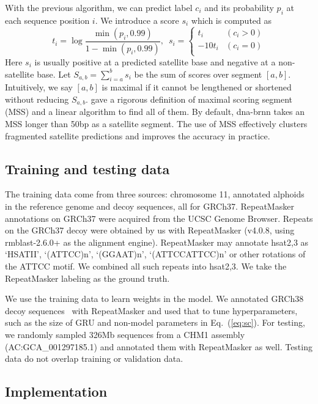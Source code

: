 \documentclass{bioinfo}
\begin{document}
\begin{methods}
With the previous algorithm, we can predict label $c_i$ and its
probability $p_i$ at each sequence position $i$. We
introduce a score $s_i$ which is computed as
\begin{equation}\label{eq:sc}
t_i=\log\frac{\min(p_i,0.99)}{1-\min(p_i,0.99)},\,\,\,
s_i=\left\{\begin{array}{ll}
t_i & (c_i>0) \\
-10t_i & (c_i=0)\\
\end{array}\right.
\end{equation}
Here $s_i$ is usually positive at a predicted satellite base and negative at a
non-satellite base. Let $S_{a,b}=\sum_{i=a}^b s_i$
be the sum of scores over segment $[a,b]$. Intuitively, we say $[a,b]$ is
maximal if it cannot be lengthened or shortened without reducing $S_{a,b}$.
\citet{DBLP:conf/ismb/RuzzoT99} gave a rigorous definition of maximal scoring
segment (MSS) and a linear algorithm to find all of them. By default,
dna-brnn takes an MSS longer than 50bp as a satellite segment. The use of MSS
effectively clusters fragmented satellite predictions and improves the accuracy
in practice.

\subsection{Training and testing data}

The training data come from three sources: chromosome 11, annotated
alphoids in the reference genome and decoy sequences, all for GRCh37.
RepeatMasker annotations on GRCh37 were acquired from the UCSC Genome Browser.
Repeats on the GRCh37 decoy were obtained by us with RepeatMasker (v4.0.8,
using rmblast-2.6.0+ as the alignment engine). RepeatMasker may annotate
hsat2,3 as `HSATII', `(ATTCC)n', `(GGAAT)n', `(ATTCCATTCC)n' or other rotations
of the ATTCC motif. We combined all such repeats into hsat2,3.  We take the
RepeatMasker labeling as the ground truth.

We use the training data to learn weights in the model. We
annotated GRCh38 decoy sequences~\citep{Mallick:2016aa} with RepeatMasker and used that to tune
hyperparameters, such as the size of GRU and non-model parameters in
Eq.~(\ref{eq:sc}). For testing, we randomly sampled 326Mb sequences from a
CHM1 assembly (AC:GCA\_001297185.1) and annotated them with RepeatMasker as
well. Testing data do not overlap training or validation data.

\subsection{Implementation}


\end{methods}
\end{document}
